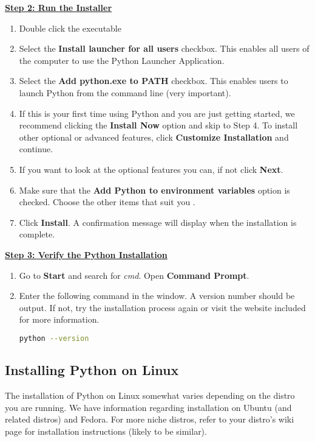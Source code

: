 \documentclass[
	a4paper, %
	12pt, %
]{CSSullivanBusinessReport}
\begin{document}
\begin{fullwidth}
\textbf{\underline{Step 2:  Run the Installer}}\\
\begin{enumerate}
	\item Double click the executable 
	\item Select the \textbf{Install launcher for all users} checkbox. This enables all users of the computer to use the Python Launcher Application.
	\item Select the \textbf{Add python.exe to PATH} checkbox. This enables users to launch Python from the command line (very important).
	\item If this is your first time using Python and you are just getting started, we recommend clicking the \textbf{Install Now} option and skip to Step 4. To install other optional or advanced features, click \textbf{Customize Installation} and continue.
	\item If you want to look at the optional features you can, if not click \textbf{Next}.
	\item Make sure that the \textbf{Add Python to environment variables} option is checked. Choose the other items that suit you . 
	\item Click \textbf{Install}. A confirmation message will display when the installation is complete.
\end{enumerate}

\textbf{\underline{Step 3:  Verify the Python Installation}}\\

\begin{enumerate}
	\item Go to \textbf{Start} and search for \textit{cmd}. Open \textbf{Command Prompt}.
	\item Enter the following command in the window. A version number should be output. If not, try the installation process again or visit the website included for more information.
	\begin{lstlisting}[language=bash]
		 python --version
	\end{lstlisting}
\end{enumerate}

\subsection{Installing Python on Linux} 
The installation of Python on Linux somewhat varies depending on the distro you are running. We have information regarding installation on Ubuntu (and related distros) and Fedora. For more niche distros, refer to your distro's wiki page for installation instructions (likely to be similar).

\end{fullwidth}
\end{document}
